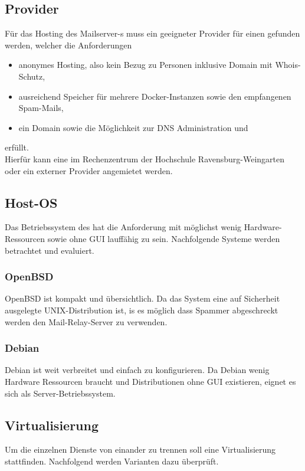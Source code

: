 \documentclass[a4paper,11pt,singlespacing]{article}
\begin{document}
	\subsection{Provider}\label{sec:Provider}
		Für das Hosting des Mailserver-s muss ein geeigneter Provider für einen  gefunden werden, welcher die Anforderungen
		\begin{itemize}
			\item anonymes Hosting, also kein Bezug zu Personen inklusive Domain mit Whois-Schutz,
			\item ausreichend Speicher für mehrere Docker-Instanzen sowie den empfangenen Spam-Mails,
			\item ein Domain sowie die Möglichkeit zur DNS Administration und
		\end{itemize}
		erfüllt.\\
		Hierfür kann eine  im Rechenzentrum der Hochschule Ravensburg-Weingarten oder ein externer Provider angemietet werden.

	\subsection{Host-OS}\label{sec:Host-Maschine}
		Das Betriebssystem des  hat die Anforderung mit möglichst wenig Hardware-Ressourcen sowie ohne GUI lauffähig zu sein.
		Nachfolgende Systeme werden betrachtet und evaluiert.

		\subsubsection{OpenBSD}\label{sec:OpenBSD}
			OpenBSD ist kompakt und übersichtlich.
			Da das System eine auf Sicherheit ausgelegte UNIX-Distribution ist, is es möglich dass Spammer abgeschreckt werden den Mail-Relay-Server zu verwenden.

		\subsubsection{Debian}\label{sec:Debian}
			Debian ist weit verbreitet und einfach zu konfigurieren.
			Da Debian wenig Hardware Ressourcen braucht und Distributionen ohne GUI existieren, eignet es sich als Server-Betriebssystem.

	\subsection{Virtualisierung}\label{sec:Virtualisierung}
		Um die einzelnen Dienste von einander zu trennen soll eine Virtualisierung stattfinden.
		Nachfolgend werden Varianten dazu überprüft.
\end{document}
